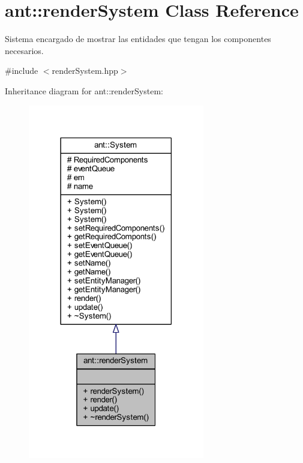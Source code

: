 \hypertarget{classant_1_1render_system}{\section{ant\+:\+:render\+System Class Reference}
\label{classant_1_1render_system}
}


Sistema encargado de mostrar las entidades que tengan los componentes necesarios.  




{\ttfamily \#include $<$render\+System.\+hpp$>$}



Inheritance diagram for ant\+:\+:render\+System\+:
\nopagebreak
\begin{figure}[H]
\begin{center}
\leavevmode
\includegraphics[width=218pt]{d6/d5d/classant_1_1render_system__inherit__graph}
\end{center}
\end{figure}


